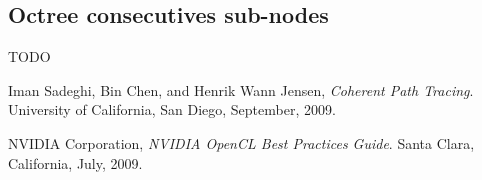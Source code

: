 \documentclass[10pt,twocolumn,a4paper]{article}
\begin{document}
\subsection{Octree consecutives sub-nodes}
TODO



\begin{thebibliography}{9}

    Iman Sadeghi, Bin Chen, and Henrik Wann Jensen,
    \emph{Coherent Path Tracing}.
    University of California, San Diego,
    September, 2009.

    NVIDIA Corporation,
    \emph{NVIDIA OpenCL Best Practices Guide}.
    Santa Clara, California,
    July, 2009.

\end{thebibliography}
\end{document}
